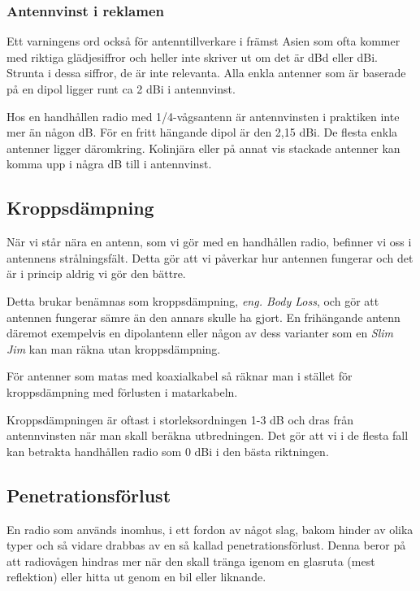 \subsubsection{Antennvinst i reklamen}

Ett varningens ord också för antenntillverkare i främst Asien som ofta kommer med riktiga glädjesiffror och heller inte skriver ut om det är dBd eller dBi. Strunta i dessa siffror, de är inte relevanta. Alla enkla antenner som är baserade på en dipol ligger runt ca 2 dBi i antennvinst. 

Hos en handhållen radio med 1/4-vågsantenn är antennvinsten i praktiken inte mer än någon dB. För en fritt hängande dipol är den 2,15 dBi. De flesta enkla antenner ligger däromkring. Kolinjära eller på annat vis stackade antenner kan komma upp i några dB till i antennvinst.

\subsection{Kroppsdämpning}

När vi står nära en antenn, som vi gör med en handhållen radio, befinner vi oss i antennens strålningsfält. Detta gör att vi påverkar hur antennen fungerar och det är i princip aldrig vi gör den bättre. 

Detta brukar benämnas som kroppsdämpning, \textit{eng. Body Loss}, och gör att antennen fungerar sämre än den annars skulle ha gjort. En frihängande antenn däremot exempelvis en dipolantenn eller någon av dess varianter som en \textit{Slim Jim} kan man räkna utan kroppsdämpning.

För antenner som matas med koaxialkabel så räknar man i stället för kroppsdämpning med förlusten i matarkabeln. 

Kroppsdämpningen är oftast i storleksordningen 1-3 dB och dras från antennvinsten när man skall beräkna utbredningen. Det gör att vi i de flesta fall kan betrakta handhållen radio som 0 dBi i den bästa riktningen.

\subsection{Penetrationsförlust}

En radio som används inomhus, i ett fordon av något slag, bakom hinder av olika typer och så vidare drabbas av en så kallad penetrationsförlust. Denna beror på att radiovågen hindras mer när den skall tränga igenom en glasruta (mest reflektion) eller hitta ut genom en bil eller liknande. 

